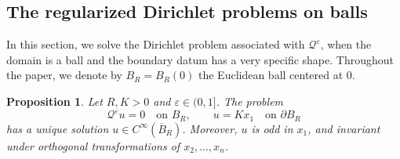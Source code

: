 \documentclass[11pt]{amsart}
\newcommand{\eps}{\varepsilon}
\newcommand{\Qe}{\mathcal Q^\eps}
\newtheorem{proposition}[theorem]{Proposition}
\theoremstyle{definition}
\theoremstyle{remark}
\numberwithin{equation}{section}
\begin{document}
\subsection{The regularized Dirichlet problems on balls}
In this section, we solve the Dirichlet problem associated with $\Qe$, when the domain is a ball and the boundary datum has a very specific shape. Throughout the paper, we denote by $B_R=B_R(0)$ the Euclidean ball centered at $0$.
\begin{proposition}\label{propositiondiriboundcondex}
Let $R,K>0$ and $\eps\in(0,1]$. The problem
\begin{equation}\label{eq_diri_ball_eps}
 \Qe u=0\quad\text{on }B_R,
 \qquad u=Kx_1\quad\text{on }\partial B_R
\end{equation}
has a unique solution $u\in C^\infty(\overline B_R)$. Moreover, $u$ is odd in $x_1$, and invariant under orthogonal transformations of $x_2,\ldots,x_n$. 
\end{proposition}
\end{document}

